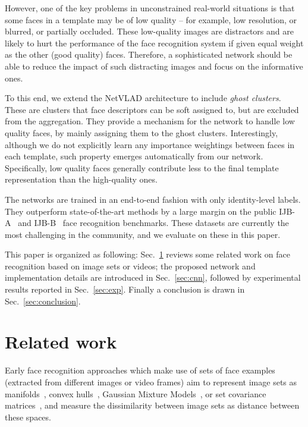 \documentclass[runningheads]{llncs}
\begin{document}
However, one of the key problems  in unconstrained real-world 
situations is that some faces in a template may be of low quality -- for example,
low resolution, or blurred, or partially occluded.
These low-quality images are distractors 
and are likely to hurt the performance of the 
face recognition system if given equal weight as the other (good quality) faces. Therefore, a sophisticated 
network should be able to reduce the impact 
of such distracting images and focus on the informative 
ones. 

To this end, we extend the NetVLAD architecture to include 
{\em  ghost clusters}. These are clusters that face descriptors can be soft assigned to, but are excluded from 
the aggregation. They provide a mechanism for the network to handle low quality faces, by mainly assigning
them to the ghost clusters.
Interestingly, although we do not explicitly learn 
any importance weightings between faces in each template, 
such property emerges automatically from our network. 
Specifically,
low quality  faces generally contribute less to the 
final template representation than the high-quality ones.

The networks are trained in an 
end-to-end fashion with only identity-level labels.
They outperform 
state-of-the-art methods by a large margin
on the public IJB-A~\cite{Klare15} 
and IJB-B~\cite{Whitelam17} face recognition benchmarks.
These datasets are currently the 
most challenging  in the community, and
we evaluate on these  in this paper.

This paper is organized as following: Sec.~\ref{sec:review}
reviews some related work on face recognition based on 
image sets or videos; the proposed network  
and implementation details are introduced
in Sec.~\ref{sec:cnn}, followed by
experimental results reported
in Sec.~\ref{sec:exp}. Finally a conclusion is drawn 
in Sec.~\ref{sec:conclusion}.




\section{Related work}
\label{sec:review}
Early face recognition approaches which make use of sets of face examples
(extracted from different images or video frames)
aim to represent
image sets as 
manifolds~\cite{Lee03,Arandjelovic06,Kim07,Wang08,Turaga11,Yang13,Huang15},
convex hulls~\cite{Cevikalp10},
Gaussian Mixture Models~\cite{Wang15a},
or set covariance matrices~\cite{Wang17a}, 
and measure the dissimilarity between image sets 
as distance
between these spaces. 
\end{document}
